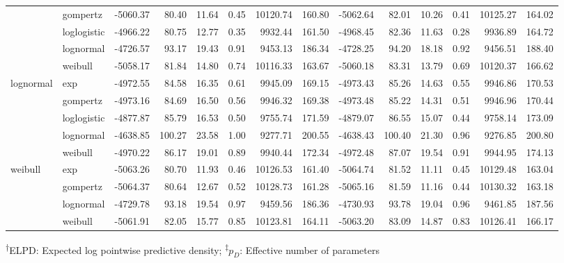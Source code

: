 \documentclass[AMA,STIX1COL]{WileyNJD-v2}
\begin{document}
\begin{center}
\begin{table}[t]
\begin{tabular}{llrrrrrrrrrrrr}
 & gompertz & -5060.37 & 80.40 & 11.64 & 0.45 & 10120.74 & 160.80 & -5062.64 & 82.01 & 10.26 & 0.41 & 10125.27 & 164.02\\
 & loglogistic & -4966.22 & 80.75 & 12.77 & 0.35 & 9932.44 & 161.50 & -4968.45 & 82.36 & 11.63 & 0.28 & 9936.89 & 164.72\\
 & lognormal & -4726.57 & 93.17 & 19.43 & 0.91 & 9453.13 & 186.34 & -4728.25 & 94.20 & 18.18 & 0.92 & 9456.51 & 188.40\\
 & weibull & -5058.17 & 81.84 & 14.80 & 0.74 & 10116.33 & 163.67 & -5060.18 & 83.31 & 13.79 & 0.69 & 10120.37 & 166.62\\
lognormal & exp & -4972.55 & 84.58 & 16.35 & 0.61 & 9945.09 & 169.15 & -4973.43 & 85.26 & 14.63 & 0.55 & 9946.86 & 170.53\\
 & gompertz & -4973.16 & 84.69 & 16.50 & 0.56 & 9946.32 & 169.38 & -4973.48 & 85.22 & 14.31 & 0.51 & 9946.96 & 170.44\\
 & loglogistic & -4877.87 & 85.79 & 16.53 & 0.50 & 9755.74 & 171.59 & -4879.07 & 86.55 & 15.07 & 0.44 & 9758.14 & 173.09\\
 & lognormal & -4638.85 & 100.27 & 23.58 & 1.00 & 9277.71 & 200.55 & -4638.43 & 100.40 & 21.30 & 0.96 & 9276.85 & 200.80\\
 & weibull & -4970.22 & 86.17 & 19.01 & 0.89 & 9940.44 & 172.34 & -4972.48 & 87.07 & 19.54 & 0.91 & 9944.95 & 174.13\\
weibull & exp & -5063.26 & 80.70 & 11.93 & 0.46 & 10126.53 & 161.40 & -5064.74 & 81.52 & 11.11 & 0.45 & 10129.48 & 163.04\\
 & gompertz & -5064.37 & 80.64 & 12.67 & 0.52 & 10128.73 & 161.28 & -5065.16 & 81.59 & 11.16 & 0.44 & 10130.32 & 163.18\\
 & lognormal & -4729.78 & 93.18 & 19.54 & 0.97 & 9459.56 & 186.36 & -4730.93 & 93.78 & 19.04 & 0.96 & 9461.85 & 187.56\\
 & weibull & -5061.91 & 82.05 & 15.77 & 0.85 & 10123.81 & 164.11 & -5063.20 & 83.09 & 14.87 & 0.83 & 10126.41 & 166.17\\
\bottomrule
\end{tabular}
\begin{tablenotes}%
\textsuperscript{$\dagger$}ELPD: Expected log pointwise predictive density;
\textsuperscript{$\ddagger$}$p_D$: Effective number of parameters
\end{tablenotes}
\end{table}
\end{center}
\end{document}
